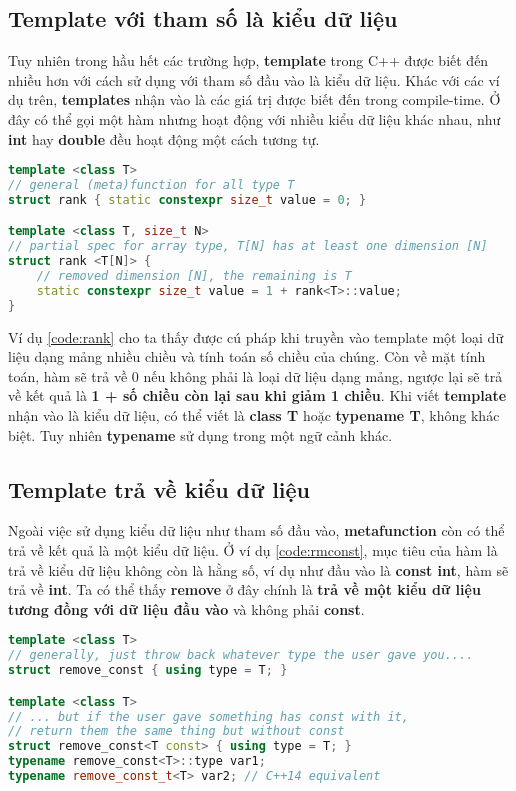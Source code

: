\subsection{Template với tham số là kiểu dữ liệu}

Tuy nhiên trong hầu hết các trường hợp, \textbf{template} trong C++ được biết đến nhiều hơn với cách sử dụng với tham số đầu vào là kiểu dữ liệu. Khác với các ví dụ trên, \textbf{templates} nhận vào là các giá trị được biết đến trong compile-time. Ở đây có thể gọi một hàm nhưng hoạt động với nhiều kiểu dữ liệu khác nhau, như \textbf{int} hay \textbf{double} đều hoạt động một cách tương tự.

\begin{lstlisting}[caption={Đếm số chiều của một array-type \cite{Walter}},label={code:rank},language=C++]
template <class T>
// general (meta)function for all type T
struct rank { static constexpr size_t value = 0; } 

template <class T, size_t N>
// partial spec for array type, T[N] has at least one dimension [N]
struct rank <T[N]> { 
    // removed dimension [N], the remaining is T
    static constexpr size_t value = 1 + rank<T>::value; 
}
\end{lstlisting}

Ví dụ \ref{code:rank} cho ta thấy được cú pháp khi truyền vào template một loại dữ liệu dạng mảng nhiều chiều và tính toán số chiều của chúng. Còn về mặt tính toán, hàm sẽ trả về 0 nếu không phải là loại dữ liệu dạng mảng, ngược lại sẽ trả về kết quả là \textbf{1 + số chiều còn lại sau khi giảm 1 chiều}. Khi viết \textbf{template} nhận vào là kiểu dữ liệu, có thể viết là \textbf{class T} hoặc \textbf{typename T}, không khác biệt. Tuy nhiên \textbf{typename} sử dụng trong một ngữ cảnh khác.

\subsection{Template trả về kiểu dữ liệu}

Ngoài việc sử dụng kiểu dữ liệu như tham số đầu vào, \textbf{metafunction} còn có thể trả về kết quả là một kiểu dữ liệu. Ở ví dụ \ref{code:rmconst}, mục tiêu của hàm là trả về kiểu dữ liệu không còn là hằng số, ví dụ như đầu vào là \textbf{const int}, hàm sẽ trả về \textbf{int}. Ta có thể thấy \textbf{remove} ở đây chính là \textbf{trả về một kiểu dữ liệu tương đồng với dữ liệu đầu vào} và không phải \textbf{const}.

\begin{lstlisting}[caption={Xoá const của một kiểu dữ liệu \cite{Walter}},label={code:rmconst},language=C++]
template <class T>
// generally, just throw back whatever type the user gave you....
struct remove_const { using type = T; } 

template <class T>
// ... but if the user gave something has const with it, 
// return them the same thing but without const
struct remove_const<T const> { using type = T; } 
typename remove_const<T>::type var1; 
typename remove_const_t<T> var2; // C++14 equivalent
\end{lstlisting}

